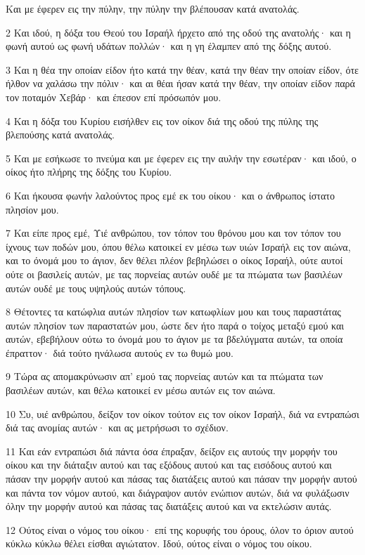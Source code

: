 \par Και με έφερεν εις την πύλην, την πύλην την βλέπουσαν κατά ανατολάς.
\par 2 Και ιδού, η δόξα του Θεού του Ισραήλ ήρχετο από της οδού της ανατολής· και η φωνή αυτού ως φωνή υδάτων πολλών· και η γη έλαμπεν από της δόξης αυτού.
\par 3 Και η θέα την οποίαν είδον ήτο κατά την θέαν, κατά την θέαν την οποίαν είδον, ότε ήλθον να χαλάσω την πόλιν· και αι θέαι ήσαν κατά την θέαν, την οποίαν είδον παρά τον ποταμόν Χεβάρ· και έπεσον επί πρόσωπόν μου.
\par 4 Και η δόξα του Κυρίου εισήλθεν εις τον οίκον διά της οδού της πύλης της βλεπούσης κατά ανατολάς.
\par 5 Και με εσήκωσε το πνεύμα και με έφερεν εις την αυλήν την εσωτέραν· και ιδού, ο οίκος ήτο πλήρης της δόξης του Κυρίου.
\par 6 Και ήκουσα φωνήν λαλούντος προς εμέ εκ του οίκου· και ο άνθρωπος ίστατο πλησίον μου.
\par 7 Και είπε προς εμέ, Υιέ ανθρώπου, τον τόπον του θρόνου μου και τον τόπον του ίχνους των ποδών μου, όπου θέλω κατοικεί εν μέσω των υιών Ισραήλ εις τον αιώνα, και το όνομά μου το άγιον, δεν θέλει πλέον βεβηλώσει ο οίκος Ισραήλ, ούτε αυτοί ούτε οι βασιλείς αυτών, με τας πορνείας αυτών ουδέ με τα πτώματα των βασιλέων αυτών ουδέ με τους υψηλούς αυτών τόπους.
\par 8 Θέτοντες τα κατώφλια αυτών πλησίον των κατωφλίων μου και τους παραστάτας αυτών πλησίον των παραστατών μου, ώστε δεν ήτο παρά ο τοίχος μεταξύ εμού και αυτών, εβεβήλουν ούτω το όνομά μου το άγιον με τα βδελύγματα αυτών, τα οποία έπραττον· διά τούτο ηνάλωσα αυτούς εν τω θυμώ μου.
\par 9 Τώρα ας απομακρύνωσιν απ' εμού τας πορνείας αυτών και τα πτώματα των βασιλέων αυτών, και θέλω κατοικεί εν μέσω αυτών εις τον αιώνα.
\par 10 Συ, υιέ ανθρώπου, δείξον τον οίκον τούτον εις τον οίκον Ισραήλ, διά να εντραπώσι διά τας ανομίας αυτών· και ας μετρήσωσι το σχέδιον.
\par 11 Και εάν εντραπώσι διά πάντα όσα έπραξαν, δείξον εις αυτούς την μορφήν του οίκου και την διάταξιν αυτού και τας εξόδους αυτού και τας εισόδους αυτού και πάσαν την μορφήν αυτού και πάσας τας διατάξεις αυτού και πάσαν την μορφήν αυτού και πάντα τον νόμον αυτού, και διάγραψον αυτόν ενώπιον αυτών, διά να φυλάξωσιν όλην την μορφήν αυτού και πάσας τας διατάξεις αυτού και να εκτελώσιν αυτάς.
\par 12 Ούτος είναι ο νόμος του οίκου· επί της κορυφής του όρους, όλον το όριον αυτού κύκλω κύκλω θέλει είσθαι αγιώτατον. Ιδού, ούτος είναι ο νόμος του οίκου.
